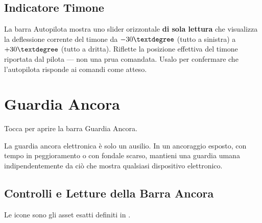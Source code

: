 \section{Indicatore Timone}

La barra Autopilota mostra uno slider orizzontale \textbf{di sola lettura} che visualizza
la deflessione corrente del timone da $-30\textdegree$ (tutto a sinistra) a
$+30\textdegree$ (tutto a dritta).
Riflette la posizione effettiva del timone riportata dal pilota --- non una prua comandata.
Usalo per confermare che l'autopilota risponde ai comandi come atteso.

\chapter{Guardia Ancora}
\label{ch:ancora}

Tocca  per aprire la barra Guardia Ancora.

\begin{warningbox}
La guardia ancora elettronica è solo un ausilio.
In un ancoraggio esposto, con tempo in peggioramento o con fondale scarso,
mantieni una guardia umana indipendentemente da ciò che mostra qualsiasi
dispositivo elettronico.
\end{warningbox}


\section{Controlli e Letture della Barra Ancora}

Le icone sono gli asset esatti definiti in .

